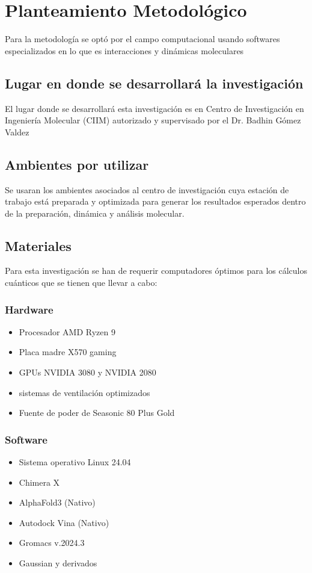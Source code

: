 \chapter{Planteamiento Metodológico}

Para la metodología se optó por el campo computacional usando softwares especializados en lo que es interacciones y dinámicas moleculares

\section{Lugar en donde se desarrollará la investigación}
El lugar donde se desarrollará esta investigación es en Centro de Investigación en Ingeniería Molecular (CIIM) autorizado y supervisado por el Dr. Badhin Gómez Valdez   

\section{Ambientes por utilizar}
Se usaran los ambientes asociados al centro de investigación cuya estación de trabajo está preparada y optimizada para generar los resultados esperados dentro de la preparación, dinámica y análisis molecular. 

\section{Materiales}
Para esta investigación se han de requerir computadores óptimos para los cálculos cuánticos que se tienen que llevar a cabo:

\subsection{Hardware}
\begin{itemize}
    \item Procesador AMD Ryzen 9 
    \item Placa madre X570 gaming
    \item GPUs NVIDIA 3080 y NVIDIA 2080
    \item sistemas de ventilación optimizados
    \item Fuente de poder de Seasonic 80 Plus Gold
\end{itemize}

\subsection{Software}
\begin{itemize}
    \item Sistema operativo Linux 24.04
    \item Chimera X
    \item AlphaFold3 (Nativo)
    \item Autodock Vina (Nativo)
    \item Gromacs v.2024.3 
    \item Gaussian y derivados
\end{itemize}

